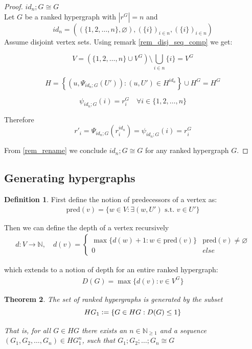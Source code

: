 \documentclass[12pt]{article}
\newtheorem{theorem}{Theorem}[section]
\theoremstyle{definition}
\newtheorem{definition}[theorem]{Definition}
\newcommand{\defeq}{\vcentcolon=}
\newcommand{\N}{\mathbb{N}}
\newcommand{\1}{\mathbbm{1}}
\newcommand{\seq}{;}
\newcommand{\pred}{\text{pred}}
\begin{document}
\begin{proof}{$id_n \seq G \cong G$}\\
    Let $G$ be a ranked hypergraph with $|r^G| = n$ and \[id_n = ((\{1,2,\dots,n\}, \varnothing), (\{i\})_{i\in n}, (\{i\})_{i\in n})\] Assume disjoint vertex sets. Using remark \ref{rem_disj_seq_comp} we get:

    \[
        V = (\{1,2,\dots,n\}\cup V^G) \setminus \bigcup_{i\in n}\{i\} = V^G
    \]
    
    \[
        H = \left\{ \left(u, \Psi_{id_n\seq G}(U')\right) : (u, U') \in H^{id_n} \right\} \cup H^G = H^G
    \]

    \[
        \psi_{id_n\seq G} (i) = r^G_i \quad \forall i\in \{1,2,\dots,n\}
    \]

    Therefore 
    \[
        r'_i = \Psi_{id_n\seq G}(r^{id_n}_i) = \psi_{id_n\seq G}(i) = r^G_i
    \]

    From \ref{rem_rename} we conclude $id_n \seq G \cong G$ for any ranked hypergraph $G$.
\end{proof}

\subsection{Generating hypergraphs}

\begin{definition}
    First define the notion of predecessors of a vertex as:
    \begin{align*}
        \pred(v) = \{w\in V : \exists(w, U') \text{ s.t. } v\in U'\}
    \end{align*}

    Then we can define the depth of a vertex recursively
    \begin{align*}
        d: V \to \N, \quad d(v) = 
        \begin{cases}
            \max\{d(w) + 1 : w\in \pred(v)\} & \pred(v) \neq \varnothing\\
            0 & else 
        \end{cases}
    \end{align*}

    which extends to a notion of depth for an entire ranked hypergraph: \begin{align*}
        D(G) = \max\{d(v) : v\in V^G\}
    \end{align*}
\end{definition} %

\begin{theorem}\label{thm_generator}
    The set of ranked hypergraphs is generated by the subset $$HG_1 \defeq \{G\in HG : D(G) \leq 1\}$$

    That is, for all $G\in HG$ there exists an $n\in \N_{\geq 1}$ and a sequence $(G_1, G_2, \dots, G_n)\in HG_1^n$, such that $G_1;G_2;\dots;G_n \cong G$
\end{theorem} %
\end{document}
